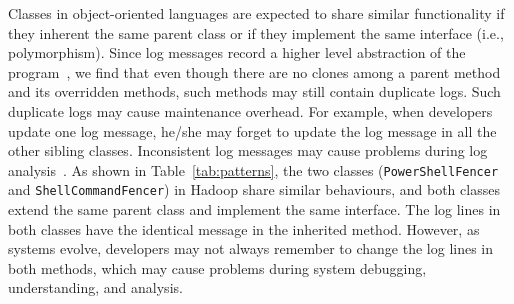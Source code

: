  Classes in object-oriented languages are expected to share similar functionality if they inherent the same parent class or if they implement the same interface (i.e., polymorphism). Since log messages record a higher level abstraction of the program~\cite{Shang:2014:ULL:2705615.2706065}, we find that even though there are no clones among a parent method and its overridden methods, such methods may still contain duplicate logs. %
Such duplicate logs may cause maintenance overhead. For example, when developers update one log message, he/she may forget to update the log message in all the other sibling classes. Inconsistent log messages may cause problems during log analysis~\cite{mehran_emse_2018, HADOOP-4190}. %
As shown in Table~\ref{tab:patterns}, the two classes ({\tt\small PowerShellFencer} and {\tt\small ShellCommandFencer}) in Hadoop share similar behaviours, and both classes extend the same parent class and implement the same interface. The log lines in both classes have the identical message in the inherited method. However, as systems evolve, developers may not always remember to change the log lines in both methods, which may cause problems during system debugging, understanding, and analysis.  



